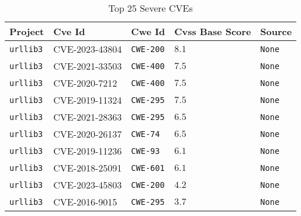 \begin{table}
\caption{Top 25 Severe CVEs}
\label{tab:most-severe-cwe}
\begin{tabular}{lllll}
\toprule
Project & Cve Id & Cwe Id & Cvss Base Score & Source \\
\midrule
\texttt{urllib3} & CVE-2023-43804 & \texttt{CWE-200} & $8.1$ & \texttt{None} \\
\texttt{urllib3} & CVE-2021-33503 & \texttt{CWE-400} & $7.5$ & \texttt{None} \\
\texttt{urllib3} & CVE-2020-7212 & \texttt{CWE-400} & $7.5$ & \texttt{None} \\
\texttt{urllib3} & CVE-2019-11324 & \texttt{CWE-295} & $7.5$ & \texttt{None} \\
\texttt{urllib3} & CVE-2021-28363 & \texttt{CWE-295} & $6.5$ & \texttt{None} \\
\texttt{urllib3} & CVE-2020-26137 & \texttt{CWE-74} & $6.5$ & \texttt{None} \\
\texttt{urllib3} & CVE-2019-11236 & \texttt{CWE-93} & $6.1$ & \texttt{None} \\
\texttt{urllib3} & CVE-2018-25091 & \texttt{CWE-601} & $6.1$ & \texttt{None} \\
\texttt{urllib3} & CVE-2023-45803 & \texttt{CWE-200} & $4.2$ & \texttt{None} \\
\texttt{urllib3} & CVE-2016-9015 & \texttt{CWE-295} & $3.7$ & \texttt{None} \\
\bottomrule
\end{tabular}
\end{table}
